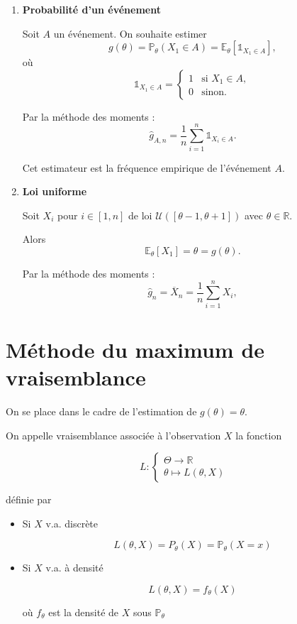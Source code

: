 \begin{exemple}
\begin{enumerate}
    \item \textbf{Probabilité d'un événement}
    
    Soit $A$ un événement. On souhaite estimer
    \[
    g(\theta) = \mathbb{P}_\theta(X_1 \in A) = \mathbb{E}_\theta[\mathbb{1}_{X_1 \in A}],
    \]
    où
    \[
    \mathbb{1}_{X_1 \in A} = \begin{cases}
    1 & \text{si } X_1 \in A, \\
    0 & \text{sinon}.
    \end{cases}
    \]
    
    Par la méthode des moments :
    \[
    \hat{g}_{A,n} = \frac{1}{n} \sum_{i=1}^n \mathbb{1}_{X_i \in A}.
    \]
    
    Cet estimateur est la fréquence empirique de l'événement $A$.
    
    \item \textbf{Loi uniforme}
    
    Soit $X_i$ pour $i \in [ 1, n ]$ de loi $\mathcal{U}([\theta-1 , \theta+1])$ avec $\theta \in \mathbb{R}$.
    
    Alors
    \[
    \mathbb{E}_\theta[X_1] = \theta = g(\theta).
    \]
    
    Par la méthode des moments :
    \[
    \hat{g}_n = \overline{X}_n = \frac{1}{n} \sum_{i=1}^n X_i,
    \]
\end{enumerate}
\end{exemple}




\section{Méthode du maximum de vraisemblance}

On se place dans le cadre de l'estimation de $g(\theta)=\theta$.

\smallskip

\begin{mdframed}
\begin{definition}
On appelle vraisemblance associée à l'observation $X$ la fonction

$$
L : 
\begin{cases}
\Theta \to \mathbb{R} \\
\theta \mapsto L(\theta,X)
\end{cases}
$$

définie par

\begin{itemize}
\item Si $X$ v.a. discrète

$$
L(\theta,X) = P_\theta (X) = \mathbb{P}_\theta (X=x)
$$
\item Si $X$ v.a. à densité

$$
L(\theta,X) = f_\theta(X)
$$

où $f_\theta$ est la densité de $X$ sous $\mathbb{P}_\theta$
\end{itemize}
\end{definition}
\end{mdframed}

